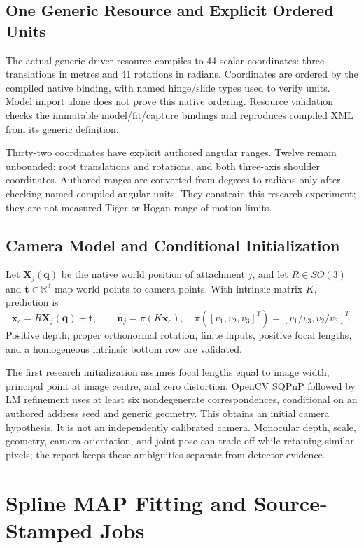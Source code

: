 \documentclass[11pt,letterpaper]{article}
\newcommand{\R}{\mathbb{R}}
\newcommand{\reportsection}[1]{\section{#1}}
\begin{document}
\subsection{One Generic Resource and Explicit Ordered Units}
The actual generic driver resource compiles to 44 scalar coordinates: three
translations in metres and 41 rotations in radians. Coordinates are ordered by
the compiled native binding, with named hinge/slide types used to verify units.
Model import alone does not prove this native ordering. Resource validation
checks the immutable model/fit/capture bindings and reproduces compiled XML from
its generic definition.

Thirty-two coordinates have explicit authored angular ranges. Twelve remain
unbounded: root translations and rotations, and both three-axis shoulder
coordinates. Authored ranges are converted from degrees to radians only after
checking named compiled angular units. They constrain this research experiment;
they are not measured Tiger or Hogan range-of-motion limits.

\subsection{Camera Model and Conditional Initialization}
Let $\mathbf X_j(\mathbf q)$ be the native world position of attachment $j$,
and let $R\in SO(3)$ and $\mathbf t\in\R^3$ map world points to camera points.
With intrinsic matrix $K$, prediction is
\begin{equation}
 \mathbf x_c=R\mathbf X_j(\mathbf q)+\mathbf t,
 \qquad \widehat{\mathbf u}_j=\pi(K\mathbf x_c),\quad
 \pi([v_1,v_2,v_3]^T)=[v_1/v_3,v_2/v_3]^T.
\end{equation}
Positive depth, proper orthonormal rotation, finite inputs, positive focal
lengths, and a homogeneous intrinsic bottom row are validated.

The first research initialization assumes focal lengths equal to image width,
principal point at image centre, and zero distortion. OpenCV SQPnP followed by
LM refinement uses at least six nondegenerate correspondences, conditional on
an authored address seed and generic geometry. This obtains an initial camera
hypothesis. It is not an independently calibrated camera. Monocular depth,
scale, geometry, camera orientation, and joint pose can trade off while
retaining similar pixels; the report keeps those ambiguities separate from
detector evidence.

\reportsection{Spline MAP Fitting and Source-Stamped Jobs}
\end{document}
